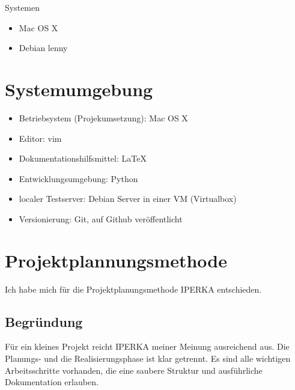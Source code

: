 Systemen
\begin{itemize}
    \item Mac OS X
    \item Debian lenny
\end{itemize}
    
\section{Systemumgebung}
\begin{itemize}
    \item Betriebsystem (Projekumsetzung): Mac OS X
    \item Editor: vim
    \item Dokumentationshilfsmittel: LaTeX
    \item Entwicklungsumgebung: Python
    \item localer Testserver: Debian Server in einer VM (Virtualbox) 
    \item Versionierung: Git, auf Github veröffentlicht
\end{itemize}

\section{Projektplannungsmethode}
Ich habe mich für die Projektplanungsmethode IPERKA entschieden. \\

\subsection{Begründung}
Für ein kleines Projekt reicht IPERKA meiner Meinung ausreichend aus. Die Planungs- und die Realisierungsphase ist klar getrennt. Es sind alle wichtigen Arbeitsschritte vorhanden, die eine saubere Struktur und ausführliche Dokumentation erlauben. 

\clearpage
